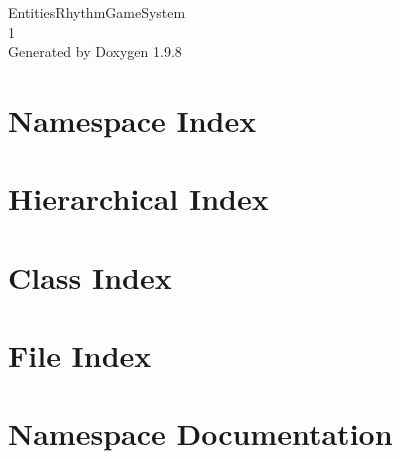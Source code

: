 \documentclass[twoside]{book}
\newcommand{\+}{\discretionary{\mbox{\scriptsize$\hookleftarrow$}}{}{}}
\newcommand{\clearemptydoublepage}{%
    \newpage{\pagestyle{empty}\cleardoublepage}%
  }
\begin{document}
  \raggedbottom
    \hypersetup{pageanchor=false,
                bookmarksnumbered=true,
                pdfencoding=unicode
               }
  \begin{titlepage}
  \vspace*{7cm}
  \begin{center}%
  {\Large Entities\+Rhythm\+Game\+System}\\
  [1ex]\large 1 \\
  \vspace*{1cm}
  {\large Generated by Doxygen 1.9.8}\\
  \end{center}
  \end{titlepage}
  \clearemptydoublepage
  \tableofcontents
  \clearemptydoublepage
  \hypersetup{pageanchor=true}
\chapter{Namespace Index}

\chapter{Hierarchical Index}

\chapter{Class Index}

\chapter{File Index}

\chapter{Namespace Documentation}















\end{document}
